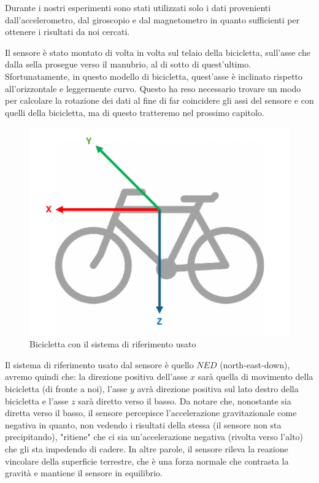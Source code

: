 \documentclass[class=article]{standalone}
\begin{document}
	Durante i nostri esperimenti sono stati utilizzati solo i dati provenienti dall'accelerometro, dal giroscopio e dal magnetometro in quanto sufficienti per ottenere i risultati da noi cercati.
		
	Il sensore è stato montato di volta in volta sul telaio della bicicletta, sull'asse che dalla sella prosegue verso il manubrio, al di sotto di quest'ultimo. Sfortunatamente, in questo modello di bicicletta, quest'asse è inclinato rispetto all'orizzontale e leggermente curvo. Questo ha reso necessario trovare un modo per calcolare la rotazione dei dati al fine di far coincidere gli assi del sensore e con quelli della bicicletta, ma di questo tratteremo nel prossimo capitolo.\hfill\break
	
	\begin{center}
		\begin{figure}[h!]
			\centering\includegraphics[width=.5\textwidth]{img/axis}
			\caption[]{Bicicletta con il sistema di riferimento usato}
			\label{fig:axis}
		\end{figure}
	\end{center}
	
	Il sistema di riferimento usato dal sensore è quello \(NED\) (north-east-down), avremo quindi che: la direzione positiva dell'asse \(x\) sarà quella di movimento della bicicletta (di fronte a noi), l'asse \(y\) avrà direzione positiva sul lato destro della bicicletta e l'asse \(z\) sarà diretto verso il basso.
	Da notare che, nonostante sia diretta verso il basso, il sensore percepisce l'accelerazione gravitazionale come negativa in quanto, non vedendo i risultati della stessa (il sensore non sta precipitando), "ritiene" che ci sia un'accelerazione negativa (rivolta verso l'alto) che gli sta impedendo di cadere. 
	In altre parole, il sensore rileva la reazione vincolare della superficie terrestre, che è una forza normale che contrasta la gravità e mantiene il sensore in equilibrio.
	
	
	
\end{document}
